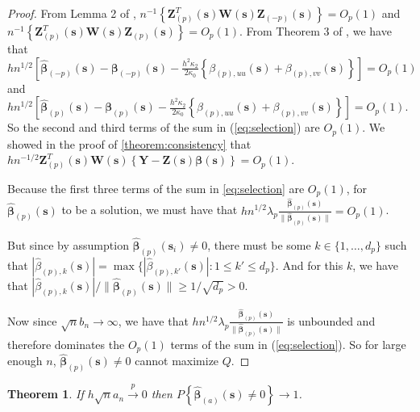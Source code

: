 \documentclass[authoryear, review, 11pt]{elsarticle}
\newtheorem{theorem}{Theorem}[section]
\begin{document}
\begin{proof}
      From Lemma 2 of \cite{Sun-Yan-Zhang-Lu-2014}, $n^{-1} \left\{ \bm{Z}_{(p)}^T(\bm{s}) \bm{W}(\bm{s}) \bm{Z}_{(-p)}(\bm{s}) \right\} = O_p(1)$ and $n^{-1} \left\{ \bm{Z}_{(p)}^T(\bm{s}) \bm{W}(\bm{s}) \bm{Z}_{(p)}(\bm{s}) \right\} = O_p(1)$. From Theorem 3 of \cite{Sun-Yan-Zhang-Lu-2014}, we have that $h n^{1/2} \left[ \hat{\bm{\beta}}_{(-p)} (\bm{s}) - \bm{\beta}_{(-p)}(\bm{s}) - \frac{h^2 \kappa_2}{2 \kappa_0} \left\{ \beta_{(p),uu}(\bm{s}) + \beta_{(p),vv}(\bm{s}) \right\}\right] = O_p(1)$ and $h n^{1/2} \left[ \hat{\bm{\beta}}_{(p)}(\bm{s}) - \bm{\beta}_{(p)}(\bm{s}) - \frac{h^2 \kappa_2}{2 \kappa_0} \left\{ \beta_{(p),uu}(\bm{s}) + \beta_{(p),vv}(\bm{s}) \right\} \right] = O_p(1)$. So the second and third terms of the sum in (\ref{eq:selection}) are $O_p(1)$. We showed in the proof of \ref{theorem:consistency} that $h  n^{-1/2} \bm{Z}_{(p)}^T(\bm{s}) \bm{W}(\bm{s}) \left\{ \bm{Y} - \bm{Z}(\bm{s}) \bm{\beta}(\bm{s}) \right\} = O_p(1)$.

      Because the first three terms of the sum in \ref{eq:selection} are $O_p(1)$, for $\hat{\bm{\beta}}_{(p)} (\bm{s})$ to be a solution, we must have that $h n^{1/2} \lambda_p \frac{ \hat{\bm{\beta}}_{(p)} (\bm{s}) }{\| \hat{\bm{\beta}}_{(p)} (\bm{s}) \|} = O_p(1)$.

      But since by assumption $\hat{\bm{\beta}}_{(p)} (\bm{s}_i) \ne 0$, there must be some $k \in \{ 1, \dots, d_p \}$ such that $ | \hat{\beta}_{(p),k} (\bm{s}) | = \max \{ | \hat{\beta}_{(p),k'} (\bm{s}) | : 1 \le k' \le d_p \} $. And for this $k$, we have that $| \hat{\beta}_{(p),k} (\bm{s}) | / \| \hat{\bm{\beta}}_{(p)} (\bm{s}) \| \ge 1 / \sqrt{d_p} > 0$.

      Now since $\sqrt{n} b_n \to \infty$, we have that $h n^{1/2} \lambda_p \frac{ \hat{\bm{\beta}}_{(p)} (\bm{s}) }{\| \hat{\bm{\beta}}_{(p)} (\bm{s}) \|}$ is unbounded and therefore dominates the $O_p(1)$ terms of the sum in (\ref{eq:selection}). So for large enough $n$, $\hat{\bm{\beta}}_{(p)} (\bm{s}) \ne 0$ cannot maximize $Q$.
    \end{proof}



    \begin{theorem}\label{theorem:selection2}   
      If $h \sqrt{n} a_n \xrightarrow{p} 0$ then $P \left\{ \hat{\bm{\beta}}_{(a)} (\bm{s}) \ne 0 \right\} \to 1$.
    \end{theorem}
\end{document}
